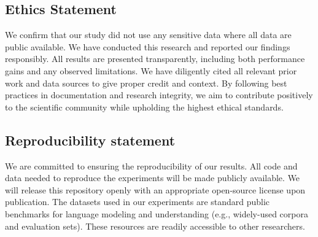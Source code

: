 \subsection{Ethics Statement}
We confirm that our study did not use any sensitive data where all data are public available. We have conducted this research and reported our findings responsibly. All results are presented transparently, including both performance gains and any observed limitations. We have diligently cited all relevant prior work and data sources to give proper credit and context. By following best practices in documentation and research integrity, we aim to contribute positively to the scientific community while upholding the highest ethical standards.
\subsection{Reproducibility statement}
We are committed to ensuring the reproducibility of our results. All code and data needed to reproduce the experiments will be made publicly available. We will release this repository openly with an appropriate open-source license upon publication. The datasets used in our experiments are standard public benchmarks for language modeling and understanding (e.g., widely-used corpora and evaluation sets). These resources are readily accessible to other researchers.

